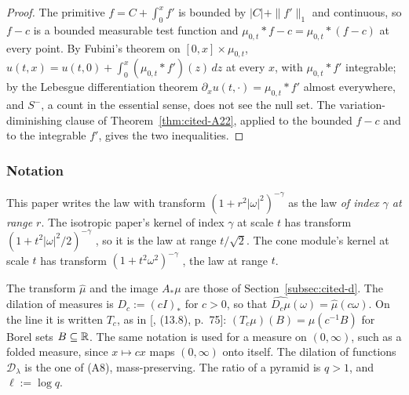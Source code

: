 \begin{proof}
The primitive $f = C + \int_0^x f'$ is bounded by $|C| + \|f'\|_1$ and continuous, so
$f - c$ is a bounded measurable test function and $\mu_{0,t} * f - c = \mu_{0,t} * (f - c)$ at
every point. By Fubini's theorem on $[0, x] \times \mu_{0,t}$,
$u(t, x) = u(t, 0) + \int_0^x (\mu_{0,t} * f')(z)\,dz$ at every $x$, with $\mu_{0,t} * f'$ integrable;
by the Lebesgue differentiation theorem $\partial_x u(t,\cdot) = \mu_{0,t} * f'$ almost everywhere,
and $S^-$, a count in the essential sense, does not see the null set. The variation-diminishing
clause of Theorem~\ref{thm:cited-A22}, applied to the bounded $f - c$ and to the integrable $f'$,
gives the two inequalities.
\end{proof}

\subsubsection{Notation}
\label{subsec:cited-notation}

This paper writes the law with transform $(1 + r^2|\omega|^2)^{-\gamma}$ as the \Matern{} law
\emph{of index $\gamma$ at range $r$}. The isotropic paper's \Matern{} kernel of index $\gamma$ at
scale $t$ has transform $(1 + t^2|\omega|^2/2)^{-\gamma}$ ,
so it is the law at range $t/\sqrt2$. The cone module's \Matern{} kernel at scale $t$ has transform
$(1 + t^2\omega^2)^{-\gamma}$ , the law at range $t$.

The transform $\widehat\mu$ and the image $A_*\mu$ are those of Section~\ref{subsec:cited-d}. The
dilation of measures is $D_c := (cI)_*$ for $c > 0$, so that
$\widehat{D_c\mu}(\omega) = \widehat\mu(c\omega)$. On the line it is written $T_c$, as in
[, (13.8), p.~75]: $(T_c\mu)(B) = \mu(c^{-1}B)$ for Borel sets $B \subseteq \mathbb{R}$. The same
notation is used for a measure on $(0,\infty)$, such as a folded \Levy{} measure, since
$x \mapsto cx$ maps $(0,\infty)$ onto itself. The dilation of functions $\mathcal{D}_\lambda$ is the
one of (A8), mass-preserving. The ratio of a pyramid is $q > 1$, and $\ell := \log q$.

